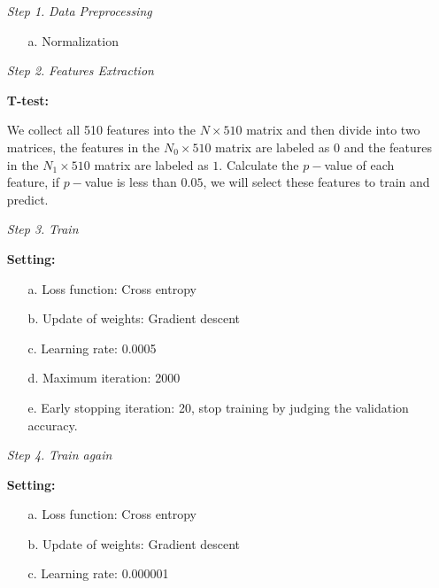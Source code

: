 \documentclass[a4paper,11pt]{article}
\begin{document}
\begin{enumerate}
	\begin{enumerate}

	\item [\textit{Step 1.}] \textit{Data Preprocessing}

		\begin{enumerate}
			\item [a.] Normalization
		\end{enumerate}

	\item [\textit{Step 2.}] \textit{Features Extraction}

	\textbf{T-test:}

		We collect all 510 features into the $N \times 510$ matrix and then divide into two matrices, the features in the $N_0 \times 510$ matrix are labeled as $0$ and the features in the $N_1 \times 510$ matrix are labeled as $1$. Calculate the $p-$value of each feature, if $p-$value is less than $0.05$, we will select these features to train and predict.

	\item [\textit{Step 3.}] \textit{Train}

	\textbf{Setting:}
			\begin{enumerate}
				\item [a.] Loss function: Cross entropy

				\item [b.] Update of weights: Gradient descent

				\item [c.] Learning rate: 0.0005

				\item [d.] Maximum iteration: 2000

				\item [e.] Early stopping iteration: 20, stop training by judging the validation accuracy.

			\end{enumerate}

	\item [\textit{Step 4.}] \textit{Train again}

	\textbf{Setting:}
			\begin{enumerate}
				\item [a.] Loss function: Cross entropy

				\item [b.] Update of weights: Gradient descent

				\item [c.] Learning rate: 0.000001


\end{enumerate}
\end{enumerate}
\end{enumerate}
\end{document}
